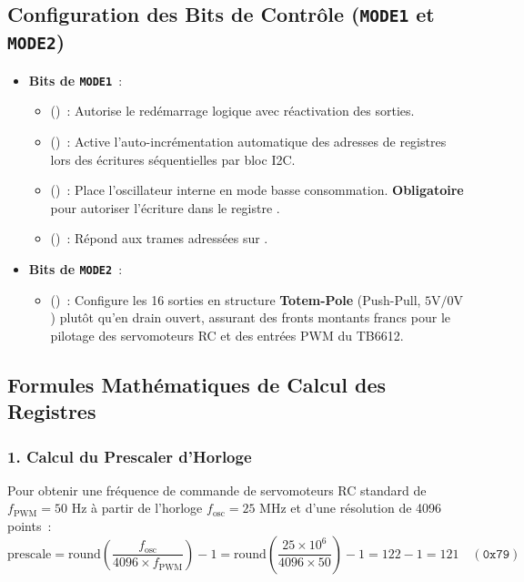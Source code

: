 \subsection{Configuration des Bits de Contrôle (\texttt{MODE1} et \texttt{MODE2})}
\begin{itemize}
    \item \textbf{Bits de \texttt{MODE1}}~:
    \begin{itemize}
        \item {} ()~: Autorise le redémarrage logique avec réactivation des sorties.
        \item {} ()~: Active l'auto-incrémentation automatique des adresses de registres lors des écritures séquentielles par bloc I2C.
        \item {} ()~: Place l'oscillateur interne en mode basse consommation. \textbf{Obligatoire} pour autoriser l'écriture dans le registre .
        \item {} ()~: Répond aux trames adressées sur .
    \end{itemize}
    \item \textbf{Bits de \texttt{MODE2}}~:
    \begin{itemize}
        \item {} ()~: Configure les 16 sorties en structure \textbf{Totem-Pole} (Push-Pull, $5\text{V} / 0\text{V}$) plutôt qu'en drain ouvert, assurant des fronts montants francs pour le pilotage des servomoteurs RC et des entrées PWM du TB6612.
    \end{itemize}
\end{itemize}

\subsection{Formules Mathématiques de Calcul des Registres}
\subsubsection{1. Calcul du Prescaler d'Horloge}
Pour obtenir une fréquence de commande de servomoteurs RC standard de $f_{\text{PWM}} = 50\text{ Hz}$ à partir de l'horloge $f_{\text{osc}} = 25\text{ MHz}$ et d'une résolution de 4096 points~:
\begin{equation}
    \text{prescale} = \text{round}\left(\frac{f_{\text{osc}}}{4096 \times f_{\text{PWM}}}\right) - 1 = \text{round}\left(\frac{25 \times 10^6}{4096 \times 50}\right) - 1 = 122 - 1 = 121 \quad (\texttt{0x79})
\end{equation}

